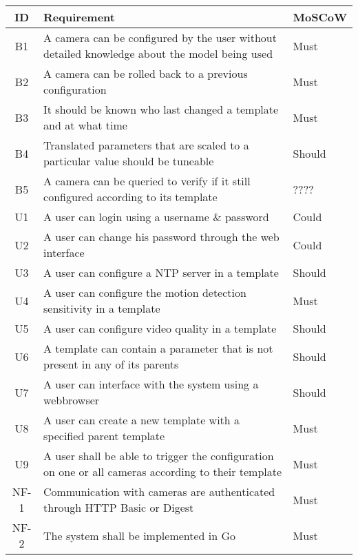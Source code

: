 \begin{table*}[h]
    \centering
    \begin{tabulary}{\linewidth}{CLL}
        \textbf{ID} & \textbf{Requirement} & \textbf{MoSCoW}
        \\ \hline %
        B1 & A camera can be configured by the user without detailed knowledge about the model being used & Must
        \\ \hline
        B2 & A camera can be rolled back to a previous configuration & Must
        \\ \hline
        B3 & It should be known who last changed a template and at what time & Must
        \\ \hline
        B4 & Translated parameters that are scaled to a particular value should be tuneable & Should
        \\ \hline
        B5 & A camera can be queried to verify if it still configured according to its template & ????
        \\ \hline
        U1 & A user can login using a username \& password & Could
        \\ \hline
        U2 & A user can change his password through the web interface & Could
        \\ \hline
        U3 & A user can configure a NTP server in a template & Should
        \\ \hline
        U4 & A user can configure the motion detection sensitivity in a template & Must
        \\ \hline
        U5 & A user can configure video quality in a template & Should
        \\ \hline
        U6 & A template can contain a parameter that is not present in any of its parents & Should
        \\ \hline
        U7 & A user can interface with the system using a webbrowser & Should
        \\ \hline
        U8 & A user can create a new template with a specified parent template & Must
        \\ \hline
        U9 & A user shall be able to trigger the configuration on one or all cameras according to their template & Must
        \\ \hline
        NF-1 & Communication with cameras are authenticated through HTTP Basic or Digest & Must
        \\ \hline
        NF-2 & The system shall be implemented in Go & Must

\end{tabulary}
\end{table*}

